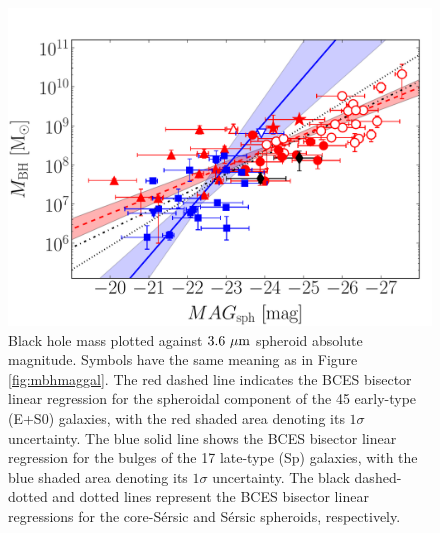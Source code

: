 \documentclass[preprint2]{emulateapj}
\begin{document}
\begin{figure}[h]
\begin{center}
\includegraphics[width=\columnwidth]{images/mbh_vs_mag_sph.pdf}
\caption{Black hole mass plotted against $3.6\rm~\mu m$ spheroid absolute magnitude. 
Symbols have the same meaning as in Figure \ref{fig:mbhmaggal}.
The red dashed line indicates the BCES bisector linear regression for the spheroidal component of the 45 early-type (E+S0) galaxies, 
with the red shaded area denoting its $1\sigma$ uncertainty. 
The blue solid line shows the BCES bisector linear regression for the bulges of the 17 late-type (Sp) galaxies, 
with the blue shaded area denoting its $1\sigma$ uncertainty. 
The black dashed-dotted and dotted lines represent the BCES bisector linear regressions for the core-S\'ersic and S\'ersic spheroids, respectively.}
\label{fig:mbhmagsph}
\end{center}
\end{figure}
\end{document}
